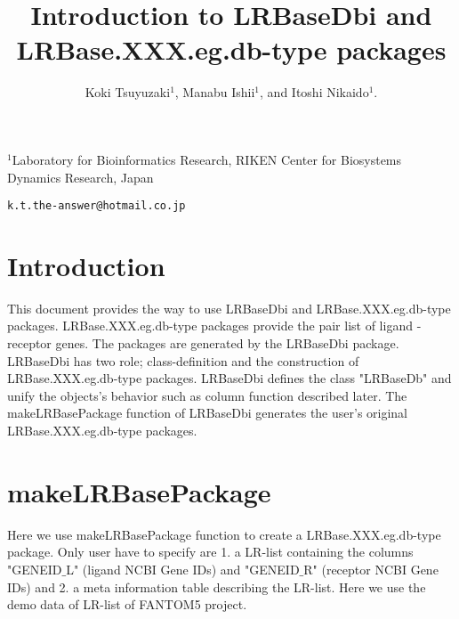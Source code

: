 \documentclass[11pt,a4paper,english,arial,twoside]{article}
\begin{document}


\title{\bf Introduction to LRBaseDbi and LRBase.XXX.eg.db-type packages}
\author{Koki Tsuyuzaki$^1$, Manabu Ishii$^1$, and Itoshi Nikaido$^1$.}
\maketitle
\begin{center}
\noindent
$^1$Laboratory for Bioinformatics Research, RIKEN Center for Biosystems
Dynamics Research, Japan\\
\noindent
\end{center}

\begin{center}
{\tt k.t.the-answer@hotmail.co.jp}
\end{center}


\section{Introduction}

This document provides the way to use LRBaseDbi and LRBase.XXX.eg.db-type packages.
LRBase.XXX.eg.db-type packages provide the pair list of ligand - receptor genes.
The packages are generated by the LRBaseDbi package.
LRBaseDbi has two role; class-definition and the construction of LRBase.XXX.eg.db-type packages.
LRBaseDbi defines the class "LRBaseDb" and unify the objects's behavior such as column function described later.
The makeLRBasePackage function of LRBaseDbi generates the user's original LRBase.XXX.eg.db-type packages.

\section{makeLRBasePackage}

Here we use makeLRBasePackage function to create a LRBase.XXX.eg.db-type package.
Only user have to specify are 1. a LR-list containing the columns "GENEID$\_$L" (ligand NCBI Gene IDs) and "GENEID$\_$R" (receptor NCBI Gene IDs) and 2. a meta information table describing the LR-list. 
Here we use the demo data of LR-list of FANTOM5 project.
\end{document}
